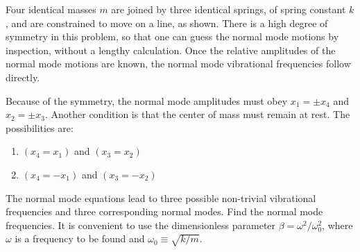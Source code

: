 \documentclass[12pt,letterpaper]{hmcpset}
\begin{document}
\begin{problem}

    Four identical masses $m$ are joined by 
    three identical springs, of spring constant
    $k$, and are constrained to move on a line,
    as shown. There is a high degree of symmetry
    in this problem, so that one can guess the normal mode
    motions by inspection, without a lengthy 
    calculation. Once the relative amplitudes of 
    the normal mode motions are known, the normal 
    mode vibrational frequencies follow directly.

    \begin{center}
    \end{center}

    Because of the symmetry, the normal mode 
    amplitudes must obey $x_{1} = \pm x_{4}$ 
    and $x_{2} = \pm x_{3}$. Another condition
    is that the center of mass must remain at
    rest. The possibilities are:

    \begin{enumerate}
        \item $(x_{4} = x_{1})$ and $(x_{3} = x_{2})$
        \item $(x_{4} = -x_{1})$ and $(x_{3} = -x_{2})$
    \end{enumerate}

    The normal mode equations lead to three 
    possible non-trivial vibrational frequencies
    and three corresponding normal modes. 
    Find the normal mode frequencies. It is 
    convenient to use the dimensionless parameter $\beta =
    \omega^{2}/\omega_{0}^{2}$, where $\omega$ is
    a frequency to be found and $\omega_{0} \equiv \sqrt{k/m}$.
\end{problem}

\begin{solution}
    \vfill
\end{solution}
\clearpage
\end{document}
